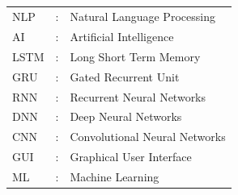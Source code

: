 \documentclass[12pt,a4paper]{report}     %
\begin{document}
\thispagestyle{empty}
\fancyhead{}
\renewcommand{\headrulewidth}{0pt}

\tableofcontents	 								%
\newpage
{\setlength{\baselineskip}{1.1\baselineskip}        %
\listoffigures
{}   %
}
\newpage
{\setlength{\baselineskip}{1.1\baselineskip}        %
\listoftables
{}
}
\newpage
		\begin{LARGE}
			\begin{flushleft}
				\section*{}
			\end{flushleft}
		\end{LARGE}
\begin{normalsize}
					\noindent
{\setlength{\baselineskip}{1.1\baselineskip}
\vspace{0.2 in}
\begin{tabular}{lll}
\vspace{0.1 in}
NLP	&	:	&	Natural Language Processing	\\
\vspace{0.1 in}
AI	&	:	&	Artificial Intelligence 	\\
\vspace{0.1 in}
LSTM	&	:	&	Long Short Term Memory 	\\
\vspace{0.1 in}
GRU	&	:	&	Gated Recurrent Unit 	\\
\vspace{0.1 in}
RNN	&	:	&	Recurrent Neural Networks 	\\
\vspace{0.1 in}
DNN	&	:	&	Deep Neural Networks 	\\
\vspace{0.1 in}
CNN	&	:	&	Convolutional Neural Networks	\\
\vspace{0.1 in}
GUI	&	:	&	Graphical User Interface	\\
\vspace{0.1 in}
ML	&	:	&	Machine Learning	\\
\end{tabular}
\par}
\end{normalsize}
\end{document}
